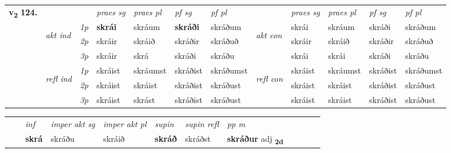 \begin{tabular}{llllllllllll} \toprule
\multirow{4}{*}{{{\textbf{v{\textsubscript{2}}} \Large{\textbf{124.}}}}}  & &   &  \textit{praes sg}  & \textit{praes pl}  &\textit{ pf sg} & \textit{pf pl} &  &  \textit{praes sg}  & \textit{praes pl}  & \textit{pf sg} & \textit{pf pl } \\*
	\cmidrule{4-7} \cmidrule{9-12}
 & \multirow{3}{*}{\begin{turn}{90}\textit{akt ind}\end{turn}} & {\textit{1p}} & \textbf{skrái} & skráum    & \textbf{skráði} & skráðum & \multirow{3}{*}{\begin{turn}{90}\textit{akt con}\end{turn}} &skrái & skráum & skráði & skráðum\\*
& &  {\textit{2p}} &  skráir  & skráið   & skráðir & skráðuð & & skráir & skráið & skráðir & skráðuð \\*
& &  {\textit{3p}} & skráir & skrá   & skráði & skráðu & & skrái & skrái& skráði & skráðu  \\*
\cmidrule{4-7} \cmidrule{9-12}
 &\multirow{3}{*}{\begin{turn}{90}\textit{refl ind}\end{turn}} & {\textit{1p}} & skráist & skráumst    & skráðist & skráðumst & \multirow{3}{*}{\begin{turn}{90}\textit{refl con}\end{turn}}  &skráist & skráumst & skráðist & skráðumst\\*
 &&  {\textit{2p}} &  skráist  & skráist   & skráðist & skráðust & &skráist & skráist & skráðist & skráðust \\*
& &  {\textit{3p}} & skráist & skrást   & skráðist & skráðust & & skráist & skráist& skráðist & skráðust  \\*
\cmidrule{4-7} \cmidrule{9-12}
\end{tabular}


\begin{tabular}{llllllllllll}
 & & \textit{inf} & \textit{imper akt sg} & \textit{imper akt pl}    & \textit{supin} & \textit{supin refl} & \textit{pp m}     \\*
  & & \textbf{skrá} & skráðu  & skráið    &  \textbf{skráð} & skráðst & \textbf{skráður} adj \textbf{\textsubscript{2d}} \\*
\cmidrule{1-12}
\end{tabular}



